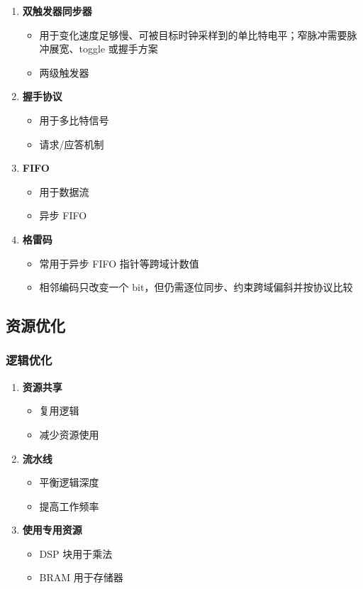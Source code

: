 \begin{enumerate}
  \item \textbf{双触发器同步器}
    \begin{itemize}
      \item 用于变化速度足够慢、可被目标时钟采样到的单比特电平；窄脉冲需要脉冲展宽、toggle 或握手方案
      \item 两级触发器
    \end{itemize}

  \item \textbf{握手协议}
    \begin{itemize}
      \item 用于多比特信号
      \item 请求/应答机制
    \end{itemize}

  \item \textbf{FIFO}
    \begin{itemize}
      \item 用于数据流
      \item 异步 FIFO
    \end{itemize}

  \item \textbf{格雷码}
    \begin{itemize}
      \item 常用于异步 FIFO 指针等跨域计数值
      \item 相邻编码只改变一个 bit，但仍需逐位同步、约束跨域偏斜并按协议比较
    \end{itemize}
\end{enumerate}

\subsection{资源优化}

\subsubsection{逻辑优化}

\begin{enumerate}
  \item \textbf{资源共享}
    \begin{itemize}
      \item 复用逻辑
      \item 减少资源使用
    \end{itemize}

  \item \textbf{流水线}
    \begin{itemize}
      \item 平衡逻辑深度
      \item 提高工作频率
    \end{itemize}

  \item \textbf{使用专用资源}
    \begin{itemize}
      \item DSP 块用于乘法
      \item BRAM 用于存储器
    \end{itemize}
\end{enumerate}

